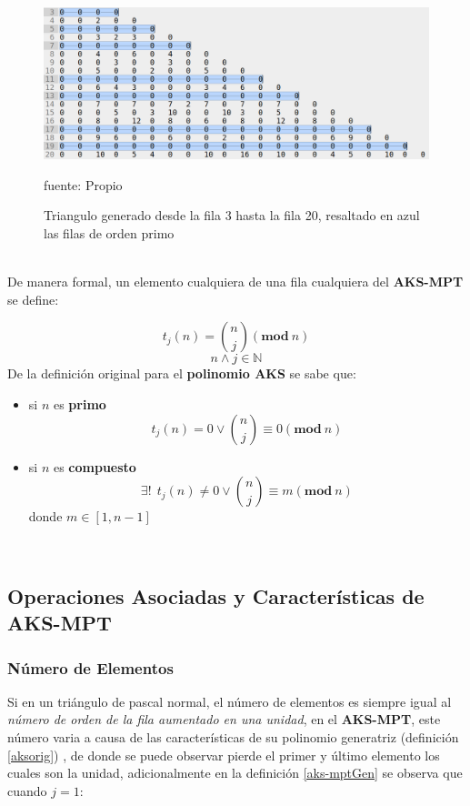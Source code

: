 \documentclass[a4paper, 12pt]{article}
\begin{document}
\begin{figure}[h!]
	\centering
	\includegraphics[width=0.7\linewidth, height=0.4\linewidth]{AKS-MPT}
	\caption[AKS - MPT]{Triangulo generado desde la fila 3 hasta la fila 20, resaltado en azul las filas de orden primo}
	\small{fuente: Propio}
	\label{fig:aks-mpt}
\end{figure}
\ \\
De manera formal, un elemento cualquiera de una fila cualquiera del \textbf{AKS-MPT} se define:

\begin{equation}\label{aks-mptGen}
t_{j}(n) = \binom{n}{j}(\mathbf{mod}\ n)
\end{equation}
\[n \land j \in \mathbb{N}\]
De la definición original para el \textbf{polinomio AKS} se sabe que:
\begin{itemize}
	\item si $n$ es \textbf{primo}
	\begin{equation}\label{primeAKSROW}
	t_{j}(n) = 0 \lor \binom{n}{j} \equiv 0(\mathbf{mod}\ n)
	\end{equation}
	\item si $n$ es \textbf{compuesto}
	\begin{equation}\label{compositeAKSROW}
	\exists ! \ \  t_{j}(n) \neq 0 \lor \binom{n}{j} \equiv m(\mathbf{mod}\ n)
	\end{equation}
	donde $m \in [1,n-1]$
\end{itemize}\

\subsection{Operaciones Asociadas y Características de AKS-MPT}

\subsubsection{Número de Elementos}

Si en un triángulo de pascal normal, el número de elementos es siempre igual al\textit{ número de orden de la fila aumentado en una unidad}, en el \textbf{AKS-MPT}, este número varia a causa de las características de su polinomio generatriz (definición \ref{aksorig}) , de donde se puede observar pierde el primer y último elemento los cuales son la unidad, adicionalmente en la definición \ref{aks-mptGen} se observa que cuando $j = 1$:
\end{document}
